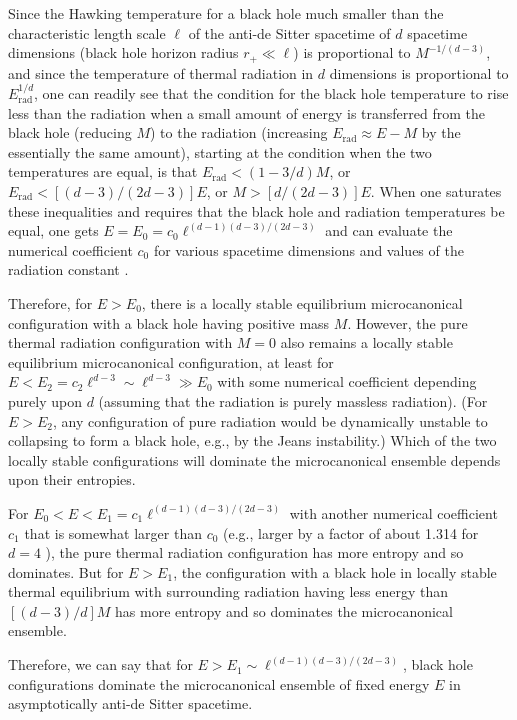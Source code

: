 \documentclass[12pt]{article} \usepackage{latexsym}
\begin{document}
Since the Hawking temperature for a black hole much smaller than the
characteristic length scale $\ell$ of the anti-de Sitter spacetime of
$d$ spacetime dimensions (black hole horizon radius $r_+ \ll \ell$) is
proportional to $M^{-1/(d-3)}$, and since the temperature of thermal
radiation in $d$ dimensions is proportional to
$E_{\mathrm{rad}}^{1/d}$, one can readily see that the condition for
the black hole temperature to rise less than the radiation when a small
amount of energy is transferred from the black hole (reducing $M$) to
the radiation (increasing $E_{\mathrm{rad}} \approx E-M$ by the
essentially the same amount), starting at the condition when the two
temperatures are equal, is that $E_{\mathrm{rad}} < (1-3/d)M$, or
$E_{\mathrm{rad}} < [(d-3)/(2d-3)]E$, or $M > [d/(2d-3)]E$.  When one
saturates these inequalities and requires that the black hole and
radiation temperatures be equal, one gets $E = E_0 = c_0
\ell^{(d-1)(d-3)/(2d-3)}$ and can evaluate the numerical coefficient
$c_0$ for various spacetime dimensions and values of the radiation
constant \cite{Haw3,PagGRG,HawPage}.

Therefore, for $E > E_0$, there is a locally stable equilibrium
microcanonical configuration with a black hole having positive mass
$M$. However, the pure thermal radiation configuration with $M=0$ also
remains a locally stable equilibrium microcanonical configuration, at
least for $E < E_2 = c_2 \ell^{d-3} \sim \ell^{d-3} \gg E_0$ with some
numerical coefficient depending purely upon $d$ (assuming that the
radiation is purely massless radiation).  (For $E > E_2$, any
configuration of pure radiation would be dynamically unstable to
collapsing to form a black hole, e.g., by the Jeans instability.) 
Which of the two locally stable configurations will dominate the
microcanonical ensemble depends upon their entropies.

For $E_0 < E < E_1 = c_1 \ell^{(d-1)(d-3)/(2d-3)}$ with another
numerical coefficient $c_1$ that is somewhat larger than $c_0$ (e.g.,
larger by a factor of about 1.314 for $d=4$ \cite{HawPage}), the pure
thermal radiation configuration has more entropy and so dominates.  But
for $E > E_1$, the configuration with a black hole in locally stable
thermal equilibrium with surrounding radiation having less energy than
$[(d-3)/d]M$ has more entropy and so dominates the microcanonical
ensemble.

Therefore, we can say that for $E > E_1 \sim \ell^{(d-1)(d-3)/(2d-3)}$,
black hole configurations dominate the microcanonical ensemble of fixed
energy $E$ in asymptotically anti-de Sitter spacetime.
\end{document}
